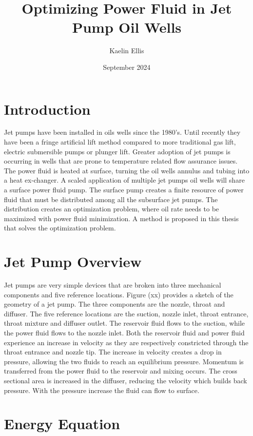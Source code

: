 \documentclass{article}
\title{Optimizing Power Fluid in Jet Pump Oil Wells}
\author{Kaelin Ellis}
\date{September 2024}
\begin{document}
\maketitle

\section{Introduction}

Jet pumps have been installed in oils wells since the 1980's. Until recently they have been a fringe artificial lift method compared to more traditional gas lift, electric submersible pumps or plunger lift. Greater adoption of jet pumps is occurring in wells that are prone to temperature related flow assurance issues. The power fluid is heated at surface, turning the oil wells annulus and tubing into a heat ex-changer. A scaled application of multiple jet pumps oil wells will share a surface power fluid pump. The surface pump creates a finite resource of power fluid that must be distributed among all the subsurface jet pumps. The distribution creates an optimization problem, where oil rate needs to be maximized with power fluid minimization. A method is proposed in this thesis that solves the optimization problem. 

\section{Jet Pump Overview}

Jet pumps are very simple devices that are broken into three mechanical components and five reference locations. Figure (xx) provides a sketch of the geometry of a jet pump. The three components are the nozzle, throat and diffuser. The five reference locations are the suction, nozzle inlet, throat entrance, throat mixture and diffuser outlet. The reservoir fluid flows to the suction, while the power fluid flows to the nozzle inlet. Both the reservoir fluid and power fluid experience an increase in velocity as they are respectively constricted through the throat entrance and nozzle tip. The increase in velocity creates a drop in pressure, allowing the two fluids to reach an equilibrium pressure. Momentum is transferred from the power fluid to the reservoir and mixing occurs. The cross sectional area is increased in the diffuser, reducing the velocity which builds back pressure. With the pressure increase the fluid can flow to surface. 

\section{Energy Equation}
\end{document}
